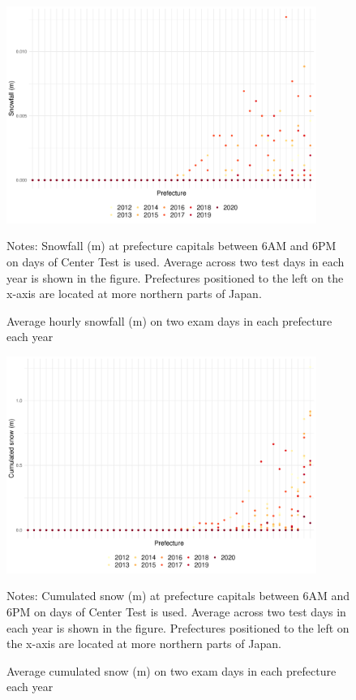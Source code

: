 \documentclass[12pt,letterpaper]{article}
\begin{document}
\begin{figure}[H]
  \centering
  \caption{Average hourly snowfall (m) on two exam days in each prefecture each year}
  \includegraphics[width = 0.9\textwidth]{../Output/images/snowfall_diff.pdf}
  \label{fig:cum_snow_diff}
  \footnotesize
  \begin{tablenotes}
    \item Notes:
      Snowfall (m) at prefecture capitals between 6AM and 6PM on days of Center Test is used.
      Average across two test days in each year is shown in the figure.
      Prefectures positioned to the left on the x-axis are located at more northern parts of Japan.
  \end{tablenotes}
\end{figure}

\begin{figure}[H]
  \centering
  \caption{Average cumulated snow (m) on two exam days in each prefecture each year}
  \includegraphics[width = 0.9\textwidth]{../Output/images/cum_snow_diff.pdf}
  \label{fig:cum_snow_diff}
  \footnotesize
  \begin{tablenotes}
    \item Notes:
      Cumulated snow (m) at prefecture capitals between 6AM and 6PM on days of Center Test is used.
      Average across two test days in each year is shown in the figure.
      Prefectures positioned to the left on the x-axis are located at more northern parts of Japan.
  \end{tablenotes}
\end{figure}
\end{document}
